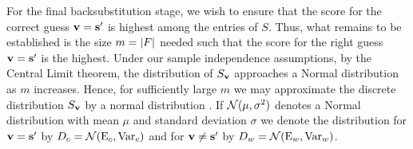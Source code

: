For the final backsubstitution stage, we wish to ensure that the score for the correct guess $\mathbf{v}=\mathbf{s'}$ is highest among the entries of $S$. Thus, what remains to be established is the size $m = |F|$ needed such that the score for the right guess $\mathbf{v} = \mathbf{s'}$ is the highest. Under our sample independence assumptions, by the Central Limit theorem, the distribution of $S_\mathbf{v}$ approaches a Normal distribution as $m$ increases. Hence, for sufficiently large $m$ we may approximate the discrete distribution $S_\mathbf{v}$ by a normal distribution \cite{baigneres-junod-vaudenay:asiacrypt2004}. 
If $\mathcal{N}({\mu,\sigma^2)}$ denotes a Normal distribution with mean $\mu$ and standard deviation $\sigma$ we denote the distribution for $\mathbf{v} = \mathbf{s'}$ by $D_c = \mathcal{N}({\textnormal{E}_c,\textnormal{Var}_c)}$ and for $\mathbf{v} \neq \mathbf{s'}$ by $D_w = \mathcal{N}({\textnormal{E}_w,\textnormal{Var}_w)}$. 

